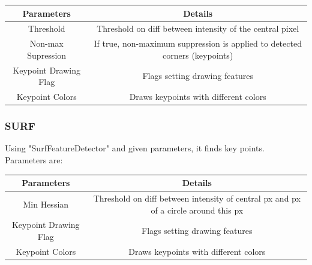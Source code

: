 \documentclass{article}
\begin{document}
\begin{table}[H]
\begin{center}
\begin{tabular}{|c|c|l|l|l|}
\hline
\textbf{Parameters}   & \multicolumn{4}{|c|}{\textbf{Details}}                                                                                        \\ \hline
Threshold             & \multicolumn{4}{|c|}{Threshold on diff between intensity of the central pixel} \\ \hline
Non-max Supression    & \multicolumn{4}{|c|}{If true, non-maximum suppression is applied to detected corners (keypoints)}                             \\ \hline
Keypoint Drawing Flag & \multicolumn{4}{|c|}{Flags setting drawing features}                                                                          \\ \hline
Keypoint Colors       & \multicolumn{4}{|c|}{Draws keypoints with different colors}                                                                   \\ \hline
\end{tabular}
\end{center}
\end{table}
	
	\subsubsection{SURF}
	Using "SurfFeatureDetector" and given parameters, it finds key points. Parameters are:
	
\begin{table}[H]
\begin{center}
\begin{tabular}{|c|c|l|l|l|}
\hline
\textbf{Parameters}   & \multicolumn{4}{|c|}{\textbf{Details}}                                                                                        \\ \hline
Min Hessian           & \multicolumn{4}{|c|}{Threshold on diff between intensity of central px and px of a circle around this px} \\ \hline
Keypoint Drawing Flag & \multicolumn{4}{|c|}{Flags setting drawing features}                                                                          \\ \hline
Keypoint Colors       & \multicolumn{4}{|c|}{Draws keypoints with different colors}                                                                   \\ \hline
\end{tabular}
\end{center}
\end{table}
	
\end{document}
